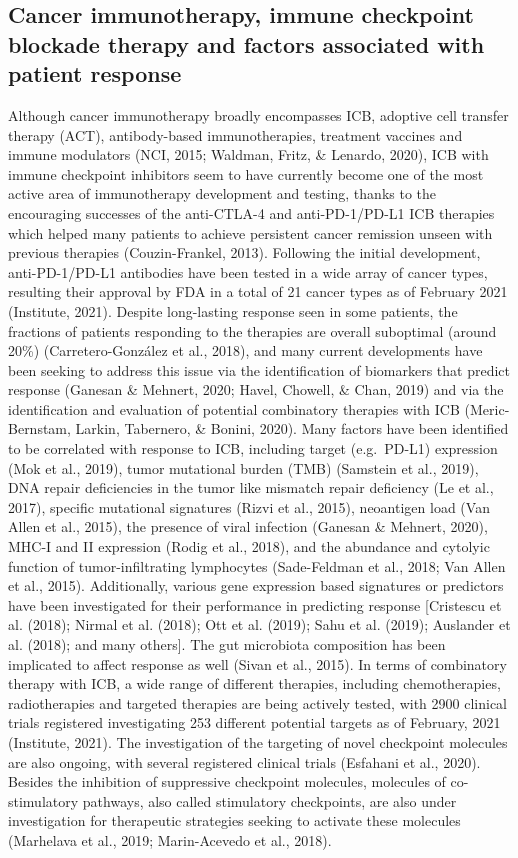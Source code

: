 \documentclass[12pt,twoside,openany,\mydriver]{thesis}  %
\begin{document}
\hypertarget{intro-icb}{%
\subsection{Cancer immunotherapy, immune checkpoint blockade therapy and factors associated with patient response}\label{intro-icb}}

Although cancer immunotherapy broadly encompasses ICB, adoptive cell transfer therapy (ACT), antibody-based immunotherapies, treatment vaccines and immune modulators (NCI, 2015; Waldman, Fritz, \& Lenardo, 2020), ICB with immune checkpoint inhibitors seem to have currently become one of the most active area of immunotherapy development and testing, thanks to the encouraging successes of the anti-CTLA-4 and anti-PD-1/PD-L1 ICB therapies which helped many patients to achieve persistent cancer remission unseen with previous therapies (Couzin-Frankel, 2013). Following the initial development, anti-PD-1/PD-L1 antibodies have been tested in a wide array of cancer types, resulting their approval by FDA in a total of 21 cancer types as of February 2021 (Institute, 2021). Despite long-lasting response seen in some patients, the fractions of patients responding to the therapies are overall suboptimal (around 20\%) (Carretero-González et al., 2018), and many current developments have been seeking to address this issue via the identification of biomarkers that predict response (Ganesan \& Mehnert, 2020; Havel, Chowell, \& Chan, 2019) and via the identification and evaluation of potential combinatory therapies with ICB (Meric-Bernstam, Larkin, Tabernero, \& Bonini, 2020). Many factors have been identified to be correlated with response to ICB, including target (e.g.~PD-L1) expression (Mok et al., 2019), tumor mutational burden (TMB) (Samstein et al., 2019), DNA repair deficiencies in the tumor like mismatch repair deficiency (Le et al., 2017), specific mutational signatures (Rizvi et al., 2015), neoantigen load (Van Allen et al., 2015), the presence of viral infection (Ganesan \& Mehnert, 2020), MHC-I and II expression (Rodig et al., 2018), and the abundance and cytolyic function of tumor-infiltrating lymphocytes (Sade-Feldman et al., 2018; Van Allen et al., 2015). Additionally, various gene expression based signatures or predictors have been investigated for their performance in predicting response {[}Cristescu et al. (2018); Nirmal et al. (2018); Ott et al. (2019); Sahu et al. (2019); Auslander et al. (2018); and many others{]}. The gut microbiota composition has been implicated to affect response as well (Sivan et al., 2015). In terms of combinatory therapy with ICB, a wide range of different therapies, including chemotherapies, radiotherapies and targeted therapies are being actively tested, with 2900 clinical trials registered investigating 253 different potential targets as of February, 2021 (Institute, 2021). The investigation of the targeting of novel checkpoint molecules are also ongoing, with several registered clinical trials (Esfahani et al., 2020). Besides the inhibition of suppressive checkpoint molecules, molecules of co-stimulatory pathways, also called stimulatory checkpoints, are also under investigation for therapeutic strategies seeking to activate these molecules (Marhelava et al., 2019; Marin-Acevedo et al., 2018).
\end{document}

